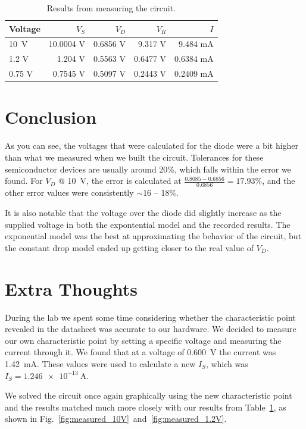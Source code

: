 \documentclass{../../ece-report}
\begin{document}
\begin{table}[h!]
  \centering
  \begin{tabular}{lrrrr}\toprule
    Voltage & $V_S$      & $V_D$    & $V_R$    & $I$ \\ \midrule
    10~V    & 10.0004 V  & 0.6856 V & 9.317  V & 9.484  mA \\
    1.2 V   & 1.204   V  & 0.5563 V & 0.6477 V & 0.6384 mA \\
    0.75 V  & 0.7545  V  & 0.5097 V & 0.2443 V & 0.2409 mA \\
    \bottomrule
  \end{tabular}
  \caption{Results from measuring the circuit.}
  \label{tab:results}
\end{table}

\section{Conclusion}

As you can see, the voltages that were calculated for
the diode were a bit higher than what we measured when
we built the circuit. Tolerances for these semiconductor
devices are usually around 20\%, which falls within
the error we found. For $V_D$ @ 10~\si{\V}, the error
is calculated at $\frac{0.8085 - 0.6856}{0.6856}=17.93\%$,
and the other error values were consistently $\sim$16
-- 18\%.

It is also notable that the voltage over the diode did
slightly increase as the supplied voltage in both the
expontential model and the recorded results. The exponential
model was the best at approximating the behavior of
the circuit, but the constant drop model ended up getting
closer to the real value of $V_D$.

\section{Extra Thoughts}

During the lab we spent some time considering whether
the characteristic point revealed in the datasheet was
accurate to our hardware. We decided to measure our
own characteristic point by setting a specific voltage
and measuring the current through it. We found that
at a voltage of 0.600~\si{\V} the current was 1.42~\si{\mA}.
These values were used to calculate a new $I_S$, which
was $I_S= \SI{1.246e-13}~\si{\A}$.

We solved the circuit once again graphically using the new
characteristic point and the results matched much more closely
with our results from Table~\ref{tab:results}, as shown in Fig.~\ref{fig:measured_10V}~and~\ref{fig:measured_1.2V}.
\end{document}
